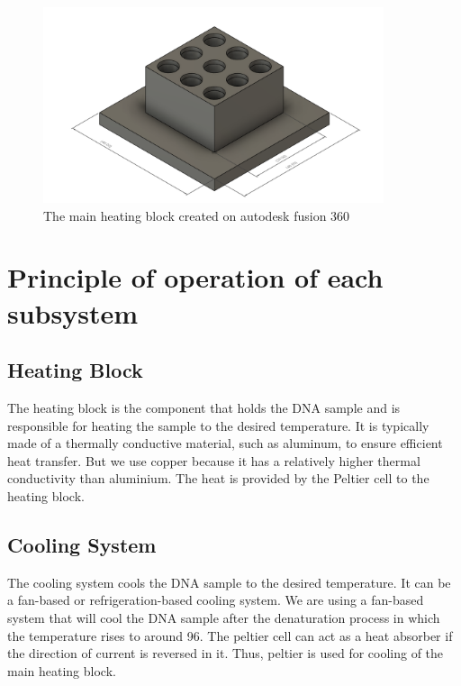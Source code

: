 \documentclass[12pt]{article}
\begin{document}
\begin{figure}[htp]
    \centering
    \includegraphics[width=10cm]{Images/Mainheatingblock.png}
    \caption{The main heating block created on autodesk fusion 360}
    \label{fig:galaxy}
\end{figure}




\maketitle

\section{Principle of operation of each subsystem}
\subsection{Heating Block}
The heating block is the component that holds the DNA sample and is responsible for heating the sample to the desired temperature. It is typically made of a thermally conductive material, such as aluminum, to ensure efficient heat transfer. But we use copper because it has a relatively higher thermal conductivity than aluminium. The heat is provided by the Peltier cell to the heating block.


\subsection{Cooling System}
The cooling system cools the DNA sample to the desired temperature. It can be a fan-based or refrigeration-based cooling system. We are using a fan-based system that will cool the DNA sample after the denaturation process in which the temperature rises to around 96. The peltier cell can act as a heat absorber if the direction of current is reversed in it. Thus, peltier is used for cooling of the main heating block.
\end{document}
